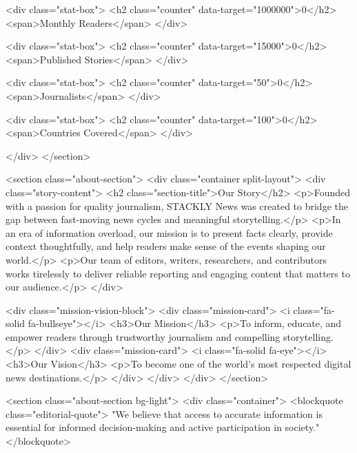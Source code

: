         <div class="stat-box">
            <h2 class="counter" data-target="1000000">0</h2>
            <span>Monthly Readers</span>
        </div>

        <div class="stat-box">
            <h2 class="counter" data-target="15000">0</h2>
            <span>Published Stories</span>
        </div>

        <div class="stat-box">
            <h2 class="counter" data-target="50">0</h2>
            <span>Journalists</span>
        </div>

        <div class="stat-box">
            <h2 class="counter" data-target="100">0</h2>
            <span>Countries Covered</span>
        </div>

    </div>
</section>

    <section class="about-section">
        <div class="container split-layout">
            <div class="story-content">
                <h2 class="section-title">Our Story</h2>
                <p>Founded with a passion for quality journalism, STACKLY News was created to bridge the gap between fast-moving news cycles and meaningful storytelling.</p>
                <p>In an era of information overload, our mission is to present facts clearly, provide context thoughtfully, and help readers make sense of the events shaping our world.</p>
                <p>Our team of editors, writers, researchers, and contributors works tirelessly to deliver reliable reporting and engaging content that matters to our audience.</p>
            </div>
            
            <div class="mission-vision-block">
                <div class="mission-card">
                    <i class="fa-solid fa-bullseye"></i>
                    <h3>Our Mission</h3>
                    <p>To inform, educate, and empower readers through trustworthy journalism and compelling storytelling.</p>
                </div>
                <div class="mission-card">
                    <i class="fa-solid fa-eye"></i>
                    <h3>Our Vision</h3>
                    <p>To become one of the world's most respected digital news destinations.</p>
                </div>
            </div>
        </div>
    </section>

    <section class="about-section bg-light">
        <div class="container">
            <blockquote class="editorial-quote">
                "We believe that access to accurate information is essential for informed decision-making and active participation in society."
            </blockquote>

